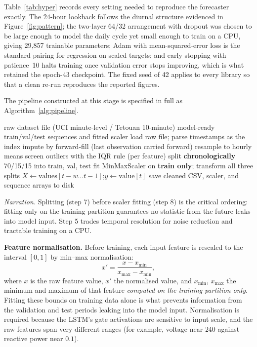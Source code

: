 \documentclass[11pt,a4paper]{article}
\begin{document}
Table~\ref{tab:hyper} records every setting needed to reproduce the forecaster exactly. The 24-hour lookback follows the diurnal structure evidenced in Figure~\ref{fig:pattern}; the two-layer 64/32 arrangement with dropout was chosen to be large enough to model the daily cycle yet small enough to train on a CPU, giving 29{,}857 trainable parameters; Adam with mean-squared-error loss is the standard pairing for regression on scaled targets; and early stopping with patience~10 halts training once validation error stops improving, which is what retained the epoch-43 checkpoint. The fixed seed of 42 applies to every library so that a clean re-run reproduces the reported figures.




The pipeline constructed at this stage is specified in full as
Algorithm~\ref{alg:pipeline}.

\begin{algorithm}[H]
\caption{End-to-end data pipeline applied identically to both datasets.}
\label{alg:pipeline}
\begin{algorithmic}[1]
\Require raw dataset file (UCI minute-level / Tetouan 10-minute)
\Ensure model-ready train/val/test sequences and fitted scaler
\State load raw file; parse timestamps as the index
 
  \State impute by forward-fill (last observation carried forward)
\EndIf
\State resample to hourly means 
\State screen outliers with the IQR rule (per feature)
\State split \textbf{chronologically} 70/15/15 into train, val, test
\State fit MinMaxScaler on \textbf{train only}; transform all three splits
 
  \State $X \gets \text{values}[t{-}w \dots t{-}1]$;\quad $y \gets \text{value}[t]$
\EndFor
\State save cleaned CSV, scaler, and sequence arrays to disk
\end{algorithmic}
\end{algorithm}
\noindent\textit{Narration.} Splitting (step 7) before scaler fitting (step 8)
is the critical ordering: fitting only on the training partition guarantees no
statistic from the future leaks into model input. Step 5 trades temporal resolution for noise reduction and tractable training on a CPU.

\noindent\textbf{Feature normalisation.} Before training, each input
feature is rescaled to the interval $[0,1]$ by min--max normalisation:
\begin{equation}
x' = \frac{x - x_{\min}}{x_{\max} - x_{\min}},
\end{equation}
where $x$ is the raw feature value, $x'$ the normalised value, and $x_{\min}$,
$x_{\max}$ the minimum and maximum of that feature \emph{computed on the training
partition only}. Fitting these bounds on training data alone is what prevents
information from the validation and test periods leaking into the model input.
Normalisation is required because the LSTM's gate activations are sensitive to
input scale, and the raw features span very different ranges (for example,
voltage near $240$ against reactive power near $0.1$).
\end{document}
